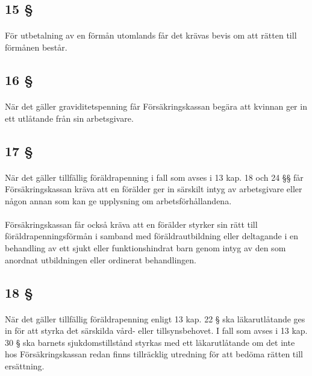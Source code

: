 \documentclass[a4paper,notitlepage,openany,10pt]{book}
\begin{document}
\subsection*{15 §}
\paragraph*{}
För utbetalning av en förmån utomlands får det krävas bevis om att rätten till förmånen består.
\subsection*{16 §}
\paragraph*{}
När det gäller graviditetspenning får Försäkringskassan begära att kvinnan ger in ett utlåtande från sin arbetsgivare.
\subsection*{17 §}
\paragraph*{}
När det gäller tillfällig föräldrapenning i fall som avses i 13 kap. 18 och 24 §§ får Försäkringskassan kräva att en förälder ger in särskilt intyg av arbetsgivare eller någon annan som kan ge upplysning om arbetsförhållandena.
\paragraph*{}
Försäkringskassan får också kräva att en förälder styrker sin rätt till föräldrapenningsförmån i samband med föräldrautbildning eller deltagande i en behandling av ett sjukt eller funktionshindrat barn genom intyg av den som anordnat utbildningen eller ordinerat behandlingen.
\subsection*{18 §}
\paragraph*{}
När det gäller tillfällig föräldrapenning enligt 13 kap. 22 § ska läkarutlåtande ges in för att styrka det särskilda vård- eller tillsynsbehovet. I fall som avses i 13 kap. 30 § ska barnets sjukdomstillstånd styrkas med ett läkarutlåtande om det inte hos Försäkringskassan redan finns tillräcklig utredning för att bedöma rätten till ersättning.
\end{document}

